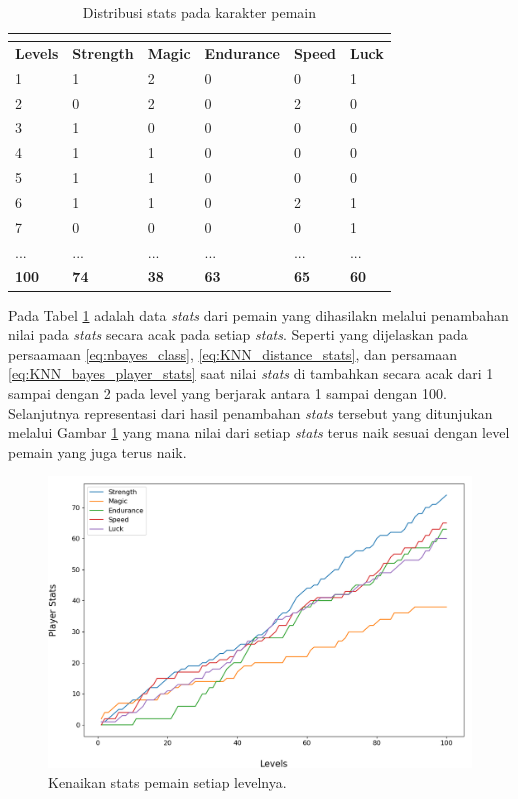 \begin{longtable}{|l|l|l|l|l|l|}
	\caption{Distribusi stats pada karakter pemain}
	\vspace{1ex}
	\label{tb:player_battle_stats}\\
	\hline
	\rowcolor[HTML]{C0C0C0} 
	\textbf{Levels} & \textbf{Strength} & \textbf{Magic} & \textbf{Endurance} & \textbf{Speed} & \textbf{Luck} \\ \hline
	1 & 1 & 2 & 0 & 0 & 1 \\ \hline
	2 & 0 & 2 & 0 & 2 & 0 \\ \hline
	3 & 1 & 0 & 0 & 0 & 0 \\ \hline
	4 & 1 & 1 & 0 & 0 & 0 \\ \hline
	5 & 1 & 1 & 0 & 0 & 0 \\ \hline
	6 & 1 & 1 & 0 & 2 & 1 \\ \hline
	7 & 0 & 0 & 0 & 0 & 1 \\ \hline
	... & ... & ... & ... & ... & ... \\ \hline
	\textbf{100} & \textbf{74} & \textbf{38} & \textbf{63} & \textbf{65} & \textbf{60} \\ \hline
\end{longtable}
\vspace{1ex}

Pada Tabel \ref{tb:player_battle_stats} adalah data \textit{stats} dari pemain yang dihasilakn melalui penambahan nilai pada \textit{stats} secara acak pada setiap \textit{stats}. Seperti yang dijelaskan pada persaamaan \ref{eq:nbayes_class}, \ref{eq:KNN_distance_stats}, dan persamaan \ref{eq:KNN_bayes_player_stats} saat nilai \textit{stats} di tambahkan secara acak dari 1 sampai dengan 2 pada level yang berjarak antara 1 sampai dengan 100. Selanjutnya representasi dari hasil penambahan \textit{stats} tersebut yang ditunjukan melalui Gambar \ref{fig:stats_player} yang mana nilai dari setiap \textit{stats} terus naik sesuai dengan level pemain yang juga terus naik. 
\vspace{1ex}

\begin{figure} [!h] \centering
	\includegraphics[scale=0.50]{img/PlayerStatsDistrib.png}
	\caption{Kenaikan stats pemain setiap levelnya.}
	\label{fig:stats_player}
\end{figure}

